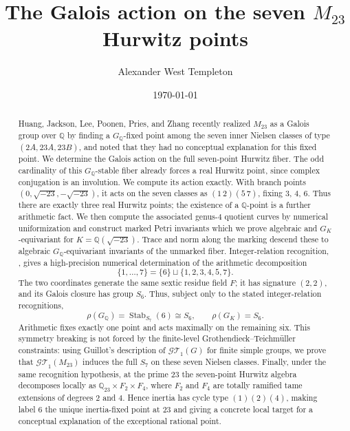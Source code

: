 \documentclass[11pt]{amsart}
\title[The Galois action on the seven $\Mtw$ Hurwitz points]{The
  Galois action on the seven $M_{23}$ Hurwitz points}
\author{Alexander West Templeton}
\date{\today}
\newcommand{\QQ}{\mathbb{Q}}
\newcommand{\GQ}{G_{\QQ}}
\newcommand{\GK}{G_{K}}
\newcommand{\Mtw}{M_{23}}
\newcommand{\sqm}{\sqrt{-23}}
\theoremstyle{plain}
\theoremstyle{definition}
\begin{document}
\begin{abstract}
Huang, Jackson, Lee, Poonen, Pries, and Zhang recently realized
$\Mtw$ as a Galois group over $\QQ$ by finding a $\GQ$-fixed point
among the seven inner Nielsen classes of type $(2A,23A,23B)$, and
noted that they had no conceptual explanation for this fixed point.
We determine the Galois action on the full seven-point Hurwitz
fiber.
%
The odd cardinality of this $\GQ$-stable fiber already forces a real
Hurwitz point, since complex conjugation is an involution. We compute
its action exactly. With
branch points $(0,\sqm,-\sqm)$, it acts on the seven classes as
$(1\,2)(5\,7)$, fixing $3$, $4$, $6$. Thus there are exactly three
real Hurwitz points; the existence of a $\QQ$-point is a further
arithmetic fact. We then compute the associated
genus-$4$ quotient curves by numerical uniformization and construct
marked Petri invariants which we prove algebraic and
$\GK$-equivariant for $K=\QQ(\sqm)$. Trace and norm along the
marking descend these to algebraic $\GQ$-equivariant invariants of
the unmarked fiber.
%
Integer-relation recognition, \ConfirmationPhrase, gives a
high-precision numerical determination of the arithmetic
decomposition
\[
  \{1,\dots,7\}=\{6\}\sqcup\{1,2,3,4,5,7\}.
\]
The two coordinates generate the same sextic residue field $F$; it
has signature $(2,2)$, and its Galois closure has group $S_6$. Thus,
subject only to the stated integer-relation recognitions,
\[
  \rho(\GQ)=\operatorname{Stab}_{S_7}(6)\cong S_6,
  \qquad
  \rho(\GK)=S_6.
\]
Arithmetic fixes exactly one point and acts maximally on the
remaining six.
%
This symmetry breaking is not forced by the finite-level
Grothendieck--Teichm\"uller constraints: using Guillot's description
of $\mathcal{GT}_1(G)$ for finite simple groups, we prove that
$\mathcal{GT}_1(\Mtw)$ induces the full $S_7$ on these seven Nielsen
classes. Finally, under the same recognition hypothesis, at the
prime $23$ the seven-point Hurwitz algebra decomposes locally as
$\QQ_{23}\times F_2\times F_4$, where $F_2$ and $F_4$ are totally
ramified tame extensions of degrees $2$ and $4$. Hence inertia has
cycle type $(1)(2)(4)$, making label $6$ the unique inertia-fixed
point at $23$ and giving a concrete local target for a conceptual
explanation of the exceptional rational point.
\end{abstract}

\maketitle
\end{document}

